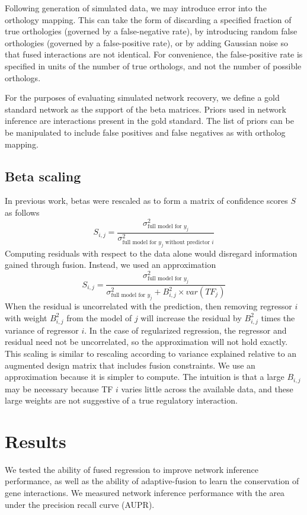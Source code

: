 \documentclass[11pt]{article}
\begin{document}
Following generation of simulated data, we may introduce error into the orthology mapping. This can take the form of discarding a specified fraction of true orthologies (governed by a false-negative rate), by introducing random false orthologies (governed by a false-positive rate), or by adding Gaussian noise so that fused interactions are not identical. For convenience, the false-positive rate is specified in units of the number of true orthologs, and not the number of possible orthologs. 

For the purposes of evaluating simulated network recovery, we define a gold standard network as the support of the beta matrices. Priors used in network inference are interactions present in the gold standard. The list of priors can be be manipulated to include false positives and false negatives as with ortholog mapping. 

\subsection{Beta scaling}
In previous work, betas were rescaled as to form a matrix of confidence scores $S$ as follows
\begin{equation}
S_{i,j} = \frac{\sigma^2_{\text{full model for }y_j}}{\sigma^2_{\text{full model for }y_j \text{ without predictor }i}}
\end{equation}
Computing residuals with respect to the data alone would disregard information gained through fusion. Instead, we used an approximation
\begin{equation}
S_{i,j} = \frac{\sigma^2_{\text{full model for }y_j}}{\sigma^2_{\text{full model for }y_j} + B_{i,j}^2 \times var(TF_j)}
\end{equation}
When the residual is uncorrelated with the prediction, then removing regressor $i$ with weight $B_{i,j}^2$ from the model of $j$ will increase the residual by $B_{i,j}^2$ times the variance of regressor $i$. In the case of regularized regression, the regressor and residual need not be uncorrelated, so the approximation will not hold exactly. This scaling is similar to rescaling according to variance explained relative to an augmented design matrix that includes fusion constraints. We use an approximation because it is simpler to compute. The intuition is that a large $B_{i,j}$ may be necessary because TF $i$ varies little across the available data, and these large weights are not suggestive of a true regulatory interaction.

\section{Results}
We tested the ability of fused regression to improve network inference performance, as well as the ability of adaptive-fusion to learn the conservation of gene interactions. We measured network inference performance with the area under the precision recall curve (AUPR). 
\end{document}
